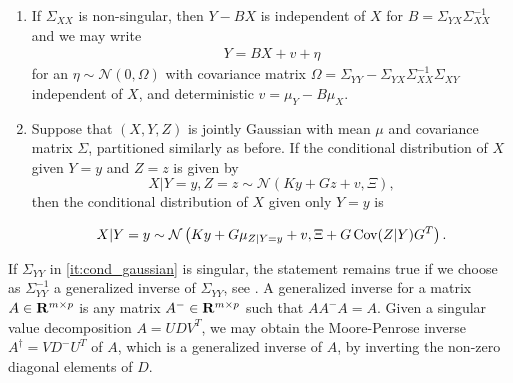 \begin{lemma}
\begin{enumerate}
        \item If $\Sigma_{XX}$ is non-singular, then $Y - BX$ is independent of $X$ for $B = \Sigma_{YX} \Sigma_{XX}^{-1}$ and we may write
            \begin{align*}
            Y = BX + v + \eta
            \end{align*}
            for an $\eta \sim \mathcal N(0, \Omega)$ with covariance matrix $\Omega = \Sigma_{YY} - \Sigma_{YX}\Sigma_{XX}^{-1}\Sigma_{XY}$ independent of $X$, and deterministic $v = \mu_{Y} - B \mu_{X}$.
        \item Suppose that $(X,Y,Z)$ is jointly Gaussian with mean $\mu$ and covariance matrix $\Sigma$, partitioned similarly as before. 
        If the conditional distribution of $X$ given $Y = y$ and $Z = z$ is given by 
        $$
        X | Y = y, Z = z \sim \mathcal N(Ky + Gz + v, \Xi),
        $$
        then the conditional distribution of $X$ given only $Y = y$ is
        
        $$
        X | Y = y \sim \mathcal N \left(Ky + G \mu_{Z| Y= y} + v, \Xi + G\operatorname{Cov} (Z | Y) G^{T}\right).
        $$
        
    \end{enumerate}
\end{lemma}

\begin{remark}
    If $\Sigma_{YY}$ in  \ref{it:cond_gaussian} is singular, the statement remains true if we choose as $\Sigma_{YY}^{-1}$ a generalized inverse of $\Sigma_{YY}$, see \citep[8.a Note 3]{Rao2002Linear}. A generalized inverse for a matrix $A\in\mathbf R^{m \times p}$ is any matrix $A^{-} \in \mathbf R^{m \times p}$ such that $AA^{-}A = A$. Given a singular value decomposition $A = UDV^{T}$, we may obtain the Moore-Penrose inverse $A^{\dagger} = V D^{-}U^{T}$ of $A$, which is a generalized inverse of $A$, by inverting the non-zero diagonal elements of $D$. 
\end{remark}

